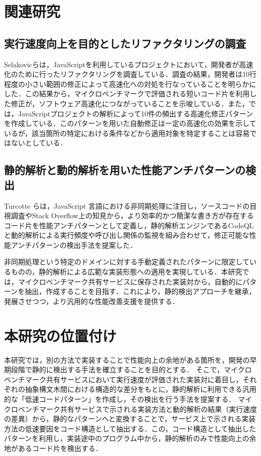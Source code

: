 \documentclass[11pt]{jreport}
\begin{document}
\section{関連研究}

\subsection{実行速度向上を目的としたリファクタリングの調査}

Selakovicら\cite{jsRefac}は，JavaScriptを利用しているプロジェクトにおいて，開発者が高速化のために行ったリファクタリングを調査している．調査の結果，開発者は10行程度の小さい範囲の修正によって高速化への対処を行なっていることを明らかにした．この結果から，マイクロベンチマークで評価される短いコード片を利用した修正が，ソフトウェア高速化につながっていることを示唆している．また，\cite{jsRefac}では，JavaScriptプロジェクトの解析によって10件の頻出する高速化修正パターンを作成している．このパターンを用いた自動修正は一定の高速化の効果を示しているが，該当箇所の特定における条件などから適用対象を特定することは容易ではないとしている．

\subsection{静的解析と動的解析を用いた性能アンチパターンの検出}

Turcotte ら\cite{DrAsync}は，JavaScript 言語における非同期処理に注目し，ソースコードの目視調査やStack Overflow上の知見から，より効率的かつ簡潔な書き方が存在するコード片を性能アンチパターンとして定義し，静的解析エンジンであるCodeQLと動的解析による実行頻度や呼び出し関係の監視を組み合わせて，修正可能な性能アンチパターンの検出手法を提案した．

非同期処理という特定のドメインに対する手動定義されたパターンに限定しているものの，静的解析による広範な実装形態への適用を実現している．本研究では，マイクロベンチマーク共有サービスに保存された実装対から，自動的にパターンを抽出，作成することを目指す．これにより，静的検出アプローチを継承，発展させつつ，より汎用的な性能改善支援を提供する．

\section{本研究の位置付け}

本研究では，別の方法で実装することで性能向上の余地がある箇所を，開発の早期段階で静的に検出する手法を確立することを目的とする．
そこで，マイクロベンチマーク共有サービスにおいて実行速度が評価された実装対に着目し，それぞれの抽象構文木間における構造的な差分をもとに，静的解析に利用できる汎用的な「低速コードパターン」を作成し，その検出を行う手法を提案する．
マイクロベンチマーク共有サービスで示される実装方法と動的解析の結果（実行速度の差異）から，静的なパターンへと変換することで，サービス上で示される実装方法の低速要因をコード構造として抽出する．この，コード構造として抽出したパターンを利用し，実装途中のプログラム中から，静的解析のみで性能向上の余地があるコード片を検出する．
\end{document}
